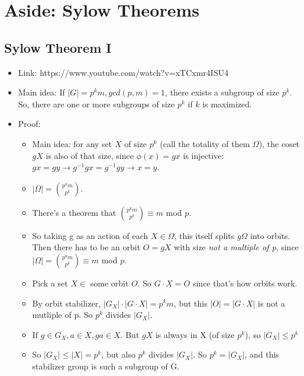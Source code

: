 \documentclass[11pt, oneside]{article}   	%
\begin{document}
\section{Aside: Sylow Theorems}

\subsection{Sylow Theorem I}
\begin{itemize}
\item Link: https://www.youtube.com/watch?v=xTCxmr4ISU4
\item Main idea: If $|G| = p^km, gcd(p,m) =1$, there exists a subgroup of size $p^k$.  So, there are one or more subgroups of size $p^k$ if $k$ is maximized.
\item Proof: 
\begin{itemize}
\item Main idea: for any set $X$ of size $p^k$ (call the totality of them $\Omega$), the coset $gX$ is also of that size, since $\phi(x) = gx$ is injective: $gx = gy \rightarrow g^{-1}gx = g^{-1}gy \rightarrow x = y$. 
\item $|\Omega| = {p^km \choose p^k}$.  
\item There's a theorem that ${p^km \choose p^k} \equiv m $ mod $p$.  
\item So taking g as an action of each $X \in \Omega$, this itself splits $g\Omega$ into orbits.  Then there has to be an orbit  $O = gX$ with size \emph{not a multiple of p}, since $|\Omega| = {p^km \choose p^k} \equiv m $ mod $p$.   
\item Pick a set $X \in $ some orbit $ O$.  So $G \cdot X = O$ since that's how orbits work.
\item By orbit stabilizer, $|G_X| \cdot |G \cdot X| = p^km$, but this $|O| = |G \cdot X|$ is not a mutliple of p.  So $p^k $ divides $ |G_X|$.
\item If $g \in G_X, a \in X, ga \in X$.  But $gX$ is always in X (of size $p^k$), so $|G_X| \leq p^k$
\item So $|G_X| \leq |X| = p^k$, but also $p^k$ divides $|G_X|$.  So $p^k = |G_X|$, and this stabilizer group is such a subgroup of G.
\end{itemize}
\end{itemize}
\end{document}
